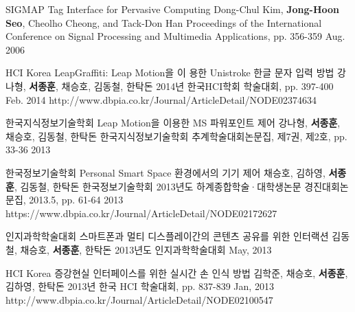 \begin{cventries}
  \cvpublicationentry
    {SIGMAP} %
    {Tag Interface for Pervasive Computing} %
    {Dong-Chul Kim, \textbf{Jong-Hoon Seo}, Cheolho Cheong, and Tack-Don Han} %
    {Proceedings of the International Conference on Signal Processing and Multimedia Applications, pp. 356-359}
    {Aug. 2006} %
    {}
\end{cventries}


\begin{cventries}
  \cvpublicationentry
    {HCI Korea} %
    {LeapGraffiti: Leap Motion을 이 용한 Unistroke 한글 문자 입력 방법} %
    {강나형, \textbf{서종훈}, 채승호, 김동철, 한탁돈} %
    {2014년 한국HCI학회 학술대회, pp. 397-400}
    {Feb. 2014} %
    {http://www.dbpia.co.kr/Journal/ArticleDetail/NODE02374634}

  \cvpublicationentry
    {한국지식정보기술학회} %
    {Leap Motion을 이용한 MS 파워포인트 제어} %
    {강나형, \textbf{서종훈}, 채승호, 김동철, 한탁돈} %
    {한국지식정보기술학회 추계학술대회논문집, 제7권, 제2호, pp. 33-36}
    {2013} %
    {}

  \cvpublicationentry
    {한국정보기술학회} %
    {Personal Smart Space 환경에서의 기기 제어} %
    {채승호, 김하영, \textbf{서종훈}, 김동철, 한탁돈} %
    {한국정보기술학회 2013년도 하계종합학술·대학생논문 경진대회논문집, 2013.5, pp. 61-64}
    {2013} %
    {https://www.dbpia.co.kr/Journal/ArticleDetail/NODE02172627}

  \cvpublicationentry
    {인지과학학술대회} %
    {스마트폰과 멀티 디스플레이간의 콘텐츠 공유를 위한 인터랙션} %
    {김동철, 채승호, \textbf{서종훈}, 한탁돈} %
    {2013년도 인지과학학술대회}
    {May, 2013} %
    {}

  \cvpublicationentry
    {HCI Korea} %
    {증강현실 인터페이스를 위한 실시간 손 인식 방법} %
    {김학준, 채승호, \textbf{서종훈}, 김하영, 한탁돈} %
    {2013년 한국 HCI 학술대회, pp. 837-839}
    {Jan, 2013} %
    {http://www.dbpia.co.kr/Journal/ArticleDetail/NODE02100547}


\end{cventries}
